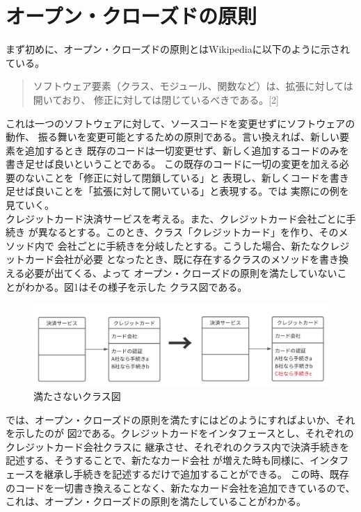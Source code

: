 \documentclass[dvipdfmx,autodetect-engine,titlepage]{jsarticle}
\begin{document}
\section{オープン・クローズドの原則}
まず初めに、オープン・クローズドの原則とはWikipediaに以下のように示されている。
\begin{quote}
  ソフトウェア要素（クラス、モジュール、関数など）は、拡張に対しては開いており、
  修正に対しては閉じているべきである。[2]
\end{quote}
これは一つのソフトウェアに対して、ソースコードを変更せずにソフトウェアの動作、
振る舞いを変更可能とするための原則である。言い換えれば、新しい要素を追加するとき
既存のコードは一切変更せず、新しく追加するコードのみを書き足せば良いということである。
この既存のコードに一切の変更を加える必要のないことを「修正に対して閉鎖している」と
表現し、新しくコードを書き足せば良いことを「拡張に対して開いている」と表現する。では
実際にの例を見ていく。\\
クレジットカード決済サービスを考える。また、クレジットカード会社ごとに手続き
が異なるとする。このとき、クラス「クレジットカード」を作り、そのメソッド内で
会社ごとに手続きを分岐したとする。こうした場合、新たなクレジットカード会社が必要
となったとき、既に存在するクラスのメソッドを書き換える必要が出てくる、よって
オープン・クローズドの原則を満たしていないことがわかる。図1はその様子を示した
クラス図である。

\begin{figure}[h]
  \centering
  \includegraphics[scale=1]{pic1.png}
  \caption{満たさないクラス図}
\end{figure}

では、オープン・クローズドの原則を満たすにはどのようにすればよいか、それを示したのが
図2である。クレジットカードをインタフェースとし、それぞれのクレジットカード会社クラスに
継承させ、それぞれのクラス内で決済手続きを記述する、そうすることで、新たなカード会社
が増えた時も同様に、インタフェースを継承し手続きを記述するだけで追加することができる。
この時、既存のコードを一切書き換えることなく、新たなカード会社を追加できているので、
これは、オープン・クローズドの原則を満たしていることがわかる。
\end{document}
